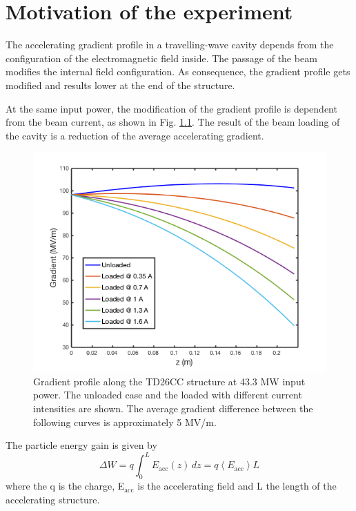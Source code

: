 \chapter[Motivation of the experiment]{Motivation of the experiment}
\label{chap:motivation}

The accelerating gradient profile in a travelling-wave cavity depends from the configuration of the electromagnetic field inside. The passage of the  beam modifies the internal field configuration. As consequence, the gradient profile gets modified and results lower at the end of the structure.

At the same input power, the modification of the gradient profile is dependent from the beam current, as shown in Fig. \ref{grad_vs_I}. The result of the beam loading of the cavity is a reduction of the average accelerating gradient.

\begin{figure}[h]
\centering 
\includegraphics[scale=0.5]{pictures/Gradient_vs_current.png}
\caption{Gradient profile along the TD26CC structure at 43.3 MW input power. The unloaded case and the loaded with different current intensities are shown. The average gradient difference between the following curves is approximately 5 MV/m.}
\label{grad_vs_I}
\end{figure}

\noindent
The particle energy gain is given by 
\begin{equation}
\Delta W  = q \int_0^L E_{\text{acc}} (z) \, dz = q \left \langle E_{\text{acc}} \right \rangle L
\label{en_gain}
\end{equation}
where the q is the charge, E$_{\text{acc}}$ is the accelerating field and L the length of the accelerating structure.


